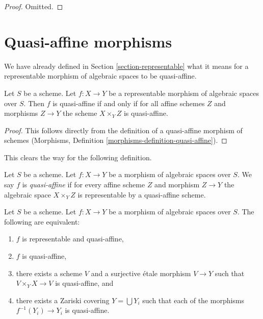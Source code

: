 \begin{proof}
Omitted.
\end{proof}











\section{Quasi-affine morphisms}
\label{section-quasi-affine}

\noindent
We have already defined in Section \ref{section-representable}
what it means for a representable morphism of algebraic spaces
to be quasi-affine.

\begin{lemma}
\label{lemma-quasi-affine-representable}
Let $S$ be a scheme. Let $f : X \to Y$ be a representable
morphism of algebraic spaces over $S$. Then
$f$ is quasi-affine if and only if for all affine schemes $Z$
and morphisms $Z \to Y$ the scheme $X \times_Y Z$ is quasi-affine.
\end{lemma}

\begin{proof}
This follows directly from the definition of a quasi-affine morphism
of schemes
(Morphisms, Definition \ref{morphisms-definition-quasi-affine}).
\end{proof}

\noindent
This clears the way for the following definition.

\begin{definition}
\label{definition-quasi-affine}
Let $S$ be a scheme.
Let $f : X \to Y$ be a morphism of algebraic spaces over $S$.
We say $f$ is {\it quasi-affine} if for every affine scheme $Z$ and
morphism $Z \to Y$ the algebraic space $X \times_Y Z$ is representable
by a quasi-affine scheme.
\end{definition}

\begin{lemma}
\label{lemma-quasi-affine-local}
Let $S$ be a scheme.
Let $f : X \to Y$ be a morphism of algebraic spaces over $S$.
The following are equivalent:
\begin{enumerate}
\item $f$ is representable and quasi-affine,
\item $f$ is quasi-affine,
\item there exists a scheme $V$ and a surjective \'etale morphism
$V \to Y$ such that $V \times_Y X \to V$ is quasi-affine, and
\item there exists a Zariski covering $Y = \bigcup Y_i$ such
that each of the morphisms $f^{-1}(Y_i) \to Y_i$ is quasi-affine.
\end{enumerate}
\end{lemma}

